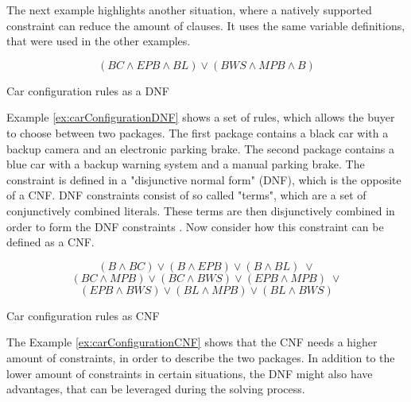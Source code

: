 The next example highlights another situation, where a natively supported constraint can reduce the amount of clauses. It uses the same variable definitions, that were used in the other examples.

\begin{example}
\begin{leftbar}
\begin{displaymath}
(BC \wedge EPB \wedge BL) \vee (BWS \wedge MPB \wedge B)
\end{displaymath}
\end{leftbar}
\caption{Car configuration rules as a DNF}
\label{ex:carConfigurationDNF}
\end{example}

Example \ref{ex:carConfigurationDNF} shows a set of rules, which allows the buyer to choose between two packages. The first package contains a black car with a backup camera and an electronic parking brake. The second package contains a blue car with a backup warning system and a manual parking brake. The constraint is defined in a "disjunctive normal form" (DNF), which is the opposite of a CNF. DNF constraints consist of so called "terms", which are a set of conjunctively combined literals. These terms are then disjunctively combined in order to form the DNF constraints \cite{biere2009handbook}. Now consider how this constraint can be defined as a CNF.

\begin{example}
\begin{leftbar}
\begin{displaymath}
(B \wedge BC) \vee (B \wedge EPB) \vee (B \wedge BL) \; \vee
\end{displaymath}
\begin{displaymath}
(BC \wedge MPB) \vee (BC \wedge BWS) \vee (EPB \wedge MPB) \; \vee
\end{displaymath}
\begin{displaymath}
(EPB \wedge BWS) \vee (BL \wedge MPB) \vee (BL \wedge BWS)
\end{displaymath}
\end{leftbar}
\caption{Car configuration rules as CNF}
\label{ex:carConfigurationCNF}
\end{example}

The Example \ref{ex:carConfigurationCNF} shows that the CNF needs a higher amount of constraints, in order to describe the two packages. In addition to the lower amount of constraints in certain situations, the DNF might also have advantages, that can be leveraged during the solving process.

